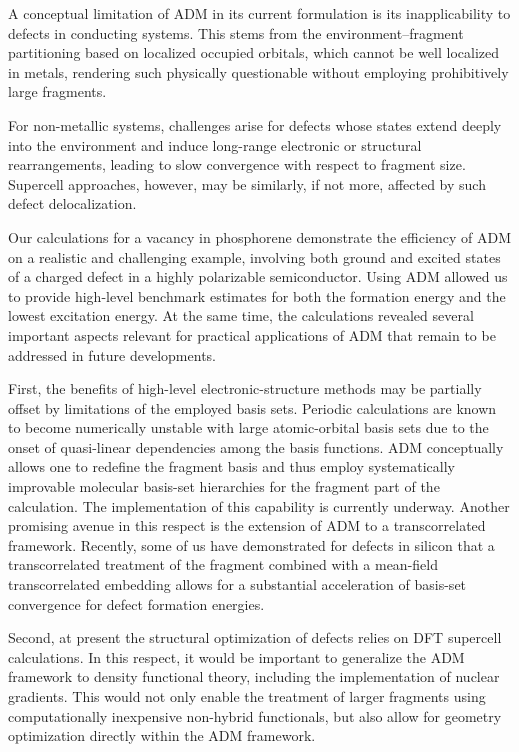 \documentclass[aip,jcp,reprint]{revtex4-2}
\begin{document}
A conceptual limitation of ADM in its current formulation is its inapplicability to defects in conducting systems. This stems from the environment–fragment partitioning based on localized occupied orbitals, which cannot be well localized in metals, rendering such physically questionable without employing prohibitively large fragments.

For non-metallic systems, challenges arise for defects whose states extend deeply into the environment and induce long-range electronic or structural rearrangements, leading to slow convergence with respect to fragment size. Supercell approaches, however, may be similarly, if not more, affected by such defect delocalization.


Our calculations for a vacancy in phosphorene demonstrate the efficiency of ADM on a realistic and challenging example, involving both ground and excited states of a charged defect in a highly polarizable semiconductor. Using ADM allowed us to provide high-level benchmark estimates for both the formation energy and the lowest excitation energy. At the same time, the calculations revealed several important aspects relevant for practical applications of ADM that remain to be addressed in future developments.

First, the benefits of high-level electronic-structure methods may be partially offset by limitations of the employed basis sets. Periodic calculations are known to become numerically unstable with large atomic-orbital basis sets due to the onset of quasi-linear dependencies among the basis functions. ADM conceptually allows one to redefine the fragment basis and thus employ systematically improvable molecular basis-set hierarchies for the fragment part of the calculation. The implementation of this capability is currently underway. Another promising avenue in this respect is the extension of ADM to a transcorrelated framework.\cite{..} Recently, some of us have demonstrated for defects in silicon that a transcorrelated treatment of the fragment combined with a mean-field transcorrelated embedding allows for a substantial acceleration of basis-set convergence for defect formation energies.\cite{..}


Second, at present the structural optimization of defects relies on DFT supercell calculations. In this respect, it would be important to generalize the ADM framework to density functional theory, including the implementation of nuclear gradients. This would not only enable the treatment of larger fragments using computationally inexpensive non-hybrid functionals, but also allow for geometry optimization directly within the ADM framework.
\end{document}
